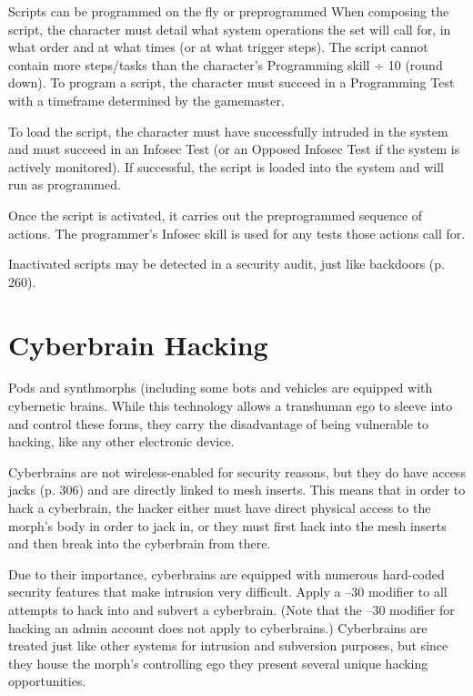 Scripts can be programmed on the fly or preprogrammed
When composing the script, the character
must detail what system operations the set will call 
for, in what order and at what times (or at what trigger
steps). The script cannot contain more steps/tasks
than the character's Programming skill ÷ 10 (round 
down). To program a script, the character must succeed
in a Programming Test with a timeframe determined
by the gamemaster.

To load the script, the character must have successfully
intruded in the system and must succeed
in an Infosec Test (or an Opposed Infosec Test if the 
system is actively monitored). If successful, the script 
is loaded into the system and will run as programmed.

Once the script is activated, it carries out the preprogrammed
sequence of actions. The programmer's
Infosec skill is used for any tests those actions call for.

Inactivated scripts may be detected in a security 
audit, just like backdoors (p. 260).

\section{Cyberbrain Hacking}

Pods and synthmorphs (including some bots and vehicles
are equipped with cybernetic brains. While this
technology allows a transhuman ego to sleeve into and 
control these forms, they carry the disadvantage of being 
vulnerable to hacking, like any other electronic device.

Cyberbrains are not wireless-enabled for security 
reasons, but they do have access jacks (p. 306) and 
are directly linked to mesh inserts. This means that 
in order to hack a cyberbrain, the hacker either must 
have direct physical access to the morph's body in 
order to jack in, or they must first hack into the mesh 
inserts and then break into the cyberbrain from there.

Due to their importance, cyberbrains are equipped 
with numerous hard-coded security features that make 
intrusion very difficult. Apply a –30 modifier to all 
attempts to hack into and subvert a cyberbrain. (Note 
that the –30 modifier for hacking an admin account 
does not apply to cyberbrains.)
Cyberbrains are treated just like other systems for 
intrusion and subversion purposes, but since they 
house the morph's controlling ego they present several 
unique hacking opportunities.

